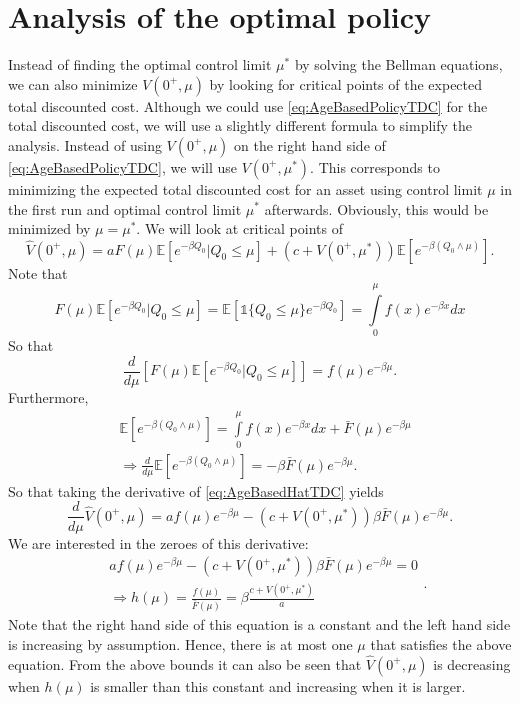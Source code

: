 \section{Analysis of the optimal policy}\label{section:AgeBasedOptimalPolicy}
Instead of finding the optimal control limit $\mu^*$ by solving the Bellman equations, we can also minimize $V(0^+,\mu)$ by looking for critical points of the expected total discounted cost.
Although we could use \eqref{eq:AgeBasedPolicyTDC} for the total discounted cost, we will use a slightly different formula to simplify the analysis.
Instead of using $V(0^+,\mu)$ on the right hand side of \eqref{eq:AgeBasedPolicyTDC}, we will use $V(0^+,\mu^*)$.
This corresponds to minimizing the expected total discounted cost for an asset using control limit $\mu$ in the first run and optimal control limit $\mu^*$ afterwards.
Obviously, this would be minimized by $\mu=\mu^*$.
We will look at critical points of
\begin{equation}\label{eq:AgeBasedHatTDC}
\hat{V}(0^+,\mu)=aF(\mu)\mathbb{E}[e^{-\beta Q_0}|Q_0\leq \mu]+(c+V(0^+,\mu^*))\mathbb{E}[e^{-\beta(Q_0\wedge\mu)}].
\end{equation}
Note that 
\[
F(\mu)\mathbb{E}[e^{-\beta Q_0}|Q_0\leq \mu]=\mathbb{E}[\mathds{1}\{Q_0\leq \mu\}e^{-\beta Q_0}]=\int\limits_0^\mu f(x)e^{-\beta x}dx
\]
So that
\[
\frac{d}{d\mu}\left[F(\mu)\mathbb{E}[e^{-\beta Q_0}|Q_0\leq \mu]\right]=f(\mu)e^{-\beta \mu}.
\]
Furthermore,
\[
\begin{split}
&\mathbb{E}[e^{-\beta(Q_0\wedge\mu)}]=\int\limits_0^\mu f(x)e^{-\beta x}dx+\bar{F}(\mu)e^{-\beta\mu}\\
&\Rightarrow \frac{d}{d\mu}\mathbb{E}[e^{-\beta(Q_0\wedge\mu)}]=-\beta\bar{F}(\mu)e^{-\beta\mu}.
\end{split}
\]
So that taking the derivative of \eqref{eq:AgeBasedHatTDC} yields
\[\frac{d}{d\mu}\hat{V}(0^+,\mu)=af(\mu)e^{-\beta\mu}-(c+V(0^+,\mu^*))\beta\bar{F}(\mu)e^{-\beta\mu}.\]
We are interested in the zeroes of this derivative:
\[
\begin{split}
&af(\mu)e^{-\beta\mu}-(c+V(0^+,\mu^*))\beta\bar{F}(\mu)e^{-\beta\mu}=0\\
&\Rightarrow h(\mu)=\frac{f(\mu)}{\bar{F}(\mu)}=\beta\frac{c+V(0^+,\mu^*)}{a}
\end{split}
.\]
Note that the right hand side of this equation is a constant and the left hand side is increasing by assumption.
Hence, there is at most one $\mu$ that satisfies the above equation.
From the above bounds it can also be seen that $\hat{V}(0^+,\mu)$ is decreasing when $h(\mu)$ is smaller than this constant and increasing when it is larger.
